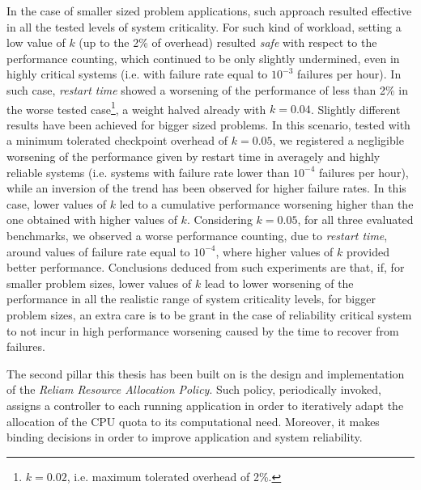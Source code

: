 In the case of smaller sized problem applications, such approach resulted effective in all the tested levels of system criticality. For such kind of workload, setting a low value of $k$ (up to the 2\% of overhead) resulted \emph{safe} with respect to the performance counting, which continued to be only slightly undermined, even in highly critical systems (i.e. with failure rate equal to $10^{-3}$ failures per hour). In such case, \emph{restart time} showed a worsening of the performance of less than 2\% in the worse tested case\footnote{$k=0.02$, i.e. maximum tolerated overhead of 2\%.}, a weight halved already with $k=0.04$. Slightly different results have been achieved for bigger sized problems. In this scenario, tested with a minimum tolerated checkpoint overhead of $k=0.05$, we registered a negligible worsening of the performance given by restart time in averagely and highly reliable systems (i.e. systems with failure rate lower than $10^{-4}$ failures per hour), while an inversion of the trend has been observed for higher failure rates. In this case, lower values of $k$ led to a cumulative performance worsening higher than the one obtained with higher values of $k$. Considering $k=0.05$, for all three evaluated benchmarks, we observed a worse performance counting, due to \emph{restart time}, around values of failure rate equal to $10^{-4}$, where higher values of $k$ provided better performance. 
Conclusions deduced from such experiments are that, if, for smaller problem sizes, lower values of $k$ lead to lower worsening of the performance in all the realistic range of system criticality levels, for bigger problem sizes, an extra care is to be grant in the case of reliability critical system to not incur in high performance worsening caused by the time to recover from failures.

The second pillar this thesis has been built on is the design and implementation of the \emph{Reliam Resource Allocation Policy}. Such policy, periodically invoked, assigns a controller to each running application in order to iteratively adapt the allocation of the CPU quota to its computational need. Moreover, it makes binding decisions in order to improve application and system reliability. 

